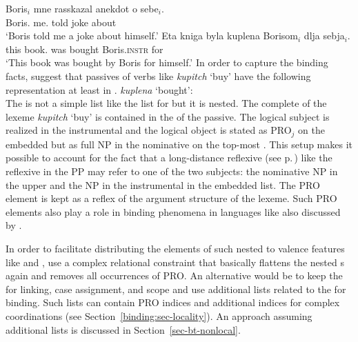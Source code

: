 \documentclass[output=paper
 	        ,biblatex
                ,babelshorthands
                ,newtxmath
                ,draftmode
                ,colorlinks, citecolor=brown
]{langscibook}
\begin{document}
\eal
\label{binding:russian-pass}
\ex  
\gll Boris$_i$    mne      rasskazal anekdot o sebe$_i$.\\
     Boris.\nom{} me.\dat{} told      joke    about \self\\
\glt `Boris told me a joke about himself.'
\ex
\gll Eta kniga byla kuplena Borisom$_{i}$ dlja sebja$_{i}$.  \\
     this book.\nom{} was bought Boris.\textsc{instr} for \self  \\
\glt `This book was bought by Boris for himself.'
\zl
In order to capture the binding facts, \citet{MS98a} suggest that passives of verbs like
\emph{kupitch} `buy' have the following representation at least in .
\ea
\emph{kuplena} `bought':\\
\z
The \argstl is not a simple list like the list for  but it is nested. The complete \argstl of
the lexeme \emph{kupitch} `buy' is contained in the \argstl of the passive. The logical subject is
realized in the instrumental and the logical object is stated as PRO$_j$ on the embedded \argst but
as full NP in the nominative on the top-most \argstl. This setup makes it possible to account for
the fact that a long-distance reflexive (see p.\,\pageref{page-long-distance-reflexives}) like the
reflexive in the PP may refer to one of the two subjects: the nominative NP in the upper \argstl and
the NP in the instrumental in the embedded list. The PRO element is kept as a reflex of the
argument structure of the lexeme. Such PRO elements also play a role in binding phenomena in languages
like  also discussed by \citeauthor{MS98a}.

In order to facilitate distributing the elements of such nested \argstls to valence features like
\subj and \comps, \citet[, 140]{MS98a} use a complex relational constraint that basically flattens the
nested \argst{}s again and removes all occurrences of PRO. An alternative would be to keep the
\argstl for linking, case assignment, and scope and use additional lists related to the \argstl for
binding. Such lists can contain PRO indices and additional indices for complex coordinations (see
Section~\ref{binding:sec-locality}). An approach assuming additional lists is discussed in Section~\ref{sec-bt-nonlocal}.
\end{document}
